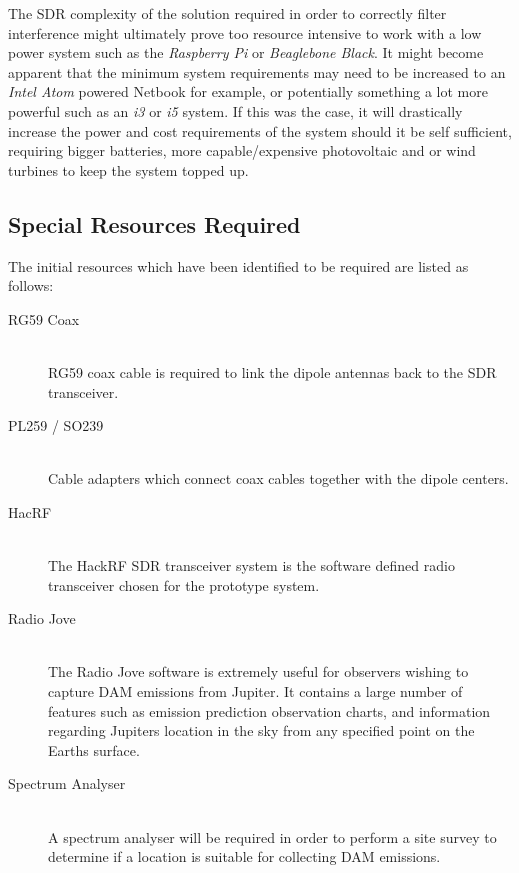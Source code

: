 \documentclass[runningheads,a4paper]{llncs}
\begin{document}
The \gls{SDR} complexity of the solution required in order to correctly filter interference might ultimately prove too resource intensive to work with a low power system such as the \textit{Raspberry Pi} or \textit{Beaglebone Black}. It might become apparent that the minimum system requirements may need to be increased to an \textit{Intel Atom} powered Netbook for example, or potentially something a lot more powerful such as an \textit{i3} or \textit{i5} system. If this was the case, it will drastically increase the power and cost requirements of the system should it be self sufficient, requiring bigger batteries, more capable/expensive photovoltaic and or wind turbines to keep the system topped up.

\subsection*{Special Resources Required}

The initial resources which have been identified to be required are listed as follows:

\begin{description}
  \item[RG59 Coax] \hfill \\
  RG59 coax cable is required to link the dipole antennas back to the \gls{SDR} transceiver.
  \item[PL259 / SO239] \hfill \\
  Cable adapters which connect coax cables together with the dipole centers.
  \item[HacRF] \hfill \\
  The HackRF \gls{SDR} transceiver system is the software defined radio transceiver chosen for the prototype system.
  \item[Radio Jove] \hfill \\
  The Radio Jove software is extremely useful for observers wishing to capture \gls{DAM} emissions from Jupiter. It contains a large number of features such as emission prediction observation charts, and information regarding Jupiters location in the sky from any specified point on the Earths surface.
  \item[Spectrum Analyser] \hfill \\
  A spectrum analyser will be required in order to perform a site survey to determine if a location is suitable for collecting \gls{DAM} emissions.
\end{description}
\end{document}
